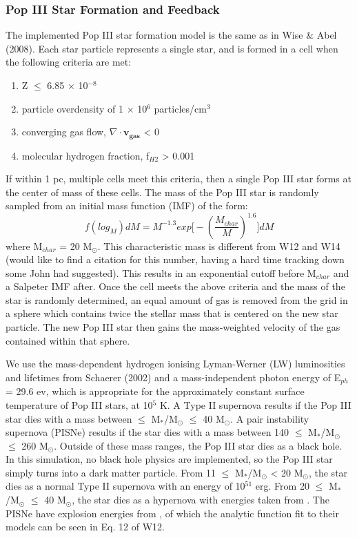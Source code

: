 \documentclass[a4paper,fleqn,usenatbib]{mnras}
\begin{document}
\subsubsection{Pop III Star Formation and Feedback }
The implemented Pop III star formation model is the same as in Wise \& Abel (2008). Each star particle represents a single star, and is formed in a cell when the following criteria are met: 
\begin{enumerate}
	\item Z $\leq$ 6.85 $\times$ 10$^{-8}$

	\item particle overdensity of 1 $\times$ 10$^{6}$ 
		particles/cm$^{3}$

	\item converging gas flow, $\nabla \cdot \mathbf{v_{gas}}$ < 0 

	\item molecular hydrogen fraction, f$_{H2}$ > 0.001
\end{enumerate}

If within 1 pc, multiple cells meet this criteria, then a single Pop III star forms at the center of mass of these cells. The mass of the Pop III star is randomly sampled from an initial mass function (IMF) of the form:
\begin{equation}
	f(log_{M})dM = M^{-1.3}exp \Big[-\left( \frac{M_{char}}{M}\right)^{1.6} \Big]dM
\end{equation}
where M$_{char}$ = 20 M$_{\odot}$. This characteristic mass is different from W12 and W14 (would like to find a citation for this number, having a hard time tracking down some John had suggested). This results in an exponential cutoff before M$_{char}$ and a Salpeter IMF after. Once the cell meets the above criteria and the mass of the star is randomly determined, an equal amount of gas is removed from the grid in a sphere which contains twice the stellar mass that is centered on the new star particle. The new Pop III star then gains the mass-weighted velocity of the gas contained within that sphere.  

We use the mass-dependent hydrogen ionising Lyman-Werner (LW) luminosities and lifetimes from Schaerer (2002) and a mass-independent photon energy of E$_{ph}$ = 29.6 ev, which is appropriate for the approximately constant surface temperature of Pop III stars, at 10$^{5}$ K. A Type II supernova results if the Pop III star dies with a mass between $\leq$ M$_{\ast}$/M$_{\odot}$ $\leq$ 40 M$_{\odot}$. A pair instability supernova (PISNe) results if the star dies with a mass between 140 $\leq$ M$_{\ast}$/M$_{\odot}$ $\leq$ 260 M$_{\odot}$. Outside of these mass ranges, the Pop III star dies as a black hole. In this simulation, no black hole physics are implemented, so the Pop III star simply turns into a dark matter particle. 
From 11 $\leq$ M$_{\ast}$/M$_{\odot}$ < 20 M$_{\odot}$, the star dies as a normal Type II supernova with an energy of 10$^{51}$ erg. From 20 $\leq$ M$_{\ast}$/M$_{\odot}$ $\leq$ 40 M$_{\odot}$, the star dies as a hypernova with energies taken from \citet{Nomoto06}.
The PISNe have explosion energies from \citet{2002ApJ...567..532H}, of which the analytic function fit to their models can be seen in Eq. 12 of W12. 
\end{document}
